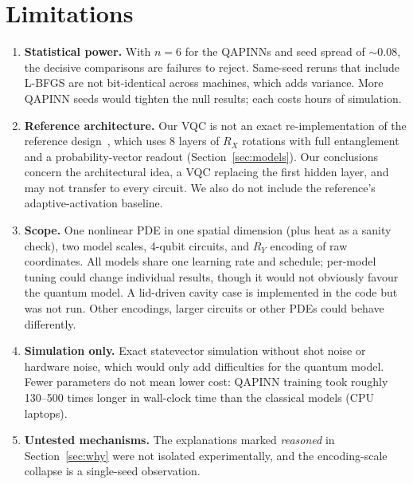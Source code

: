 \documentclass[11pt]{article}
\begin{document}
\section{Limitations}
\begin{enumerate}[nosep]
  \item \textbf{Statistical power.} With $n=6$ for the QAPINNs and seed spread of
  $\sim$0.08, the decisive comparisons are failures to reject. Same-seed reruns that include L-BFGS
  are not bit-identical across machines, which adds variance. More QAPINN seeds would
  tighten the null results; each costs hours of simulation.
  \item \textbf{Reference architecture.} Our VQC is not an exact re-implementation of the
  reference design~\cite{qapinn}, which uses 8 layers of $R_X$ rotations with full
  entanglement and a probability-vector readout (Section~\ref{sec:models}). Our conclusions concern
  the architectural idea, a VQC replacing the first hidden layer, and may not transfer
  to every circuit. We also do not include the reference's adaptive-activation
  baseline.
  \item \textbf{Scope.} One nonlinear PDE in one spatial dimension (plus heat as a
  sanity check), two model scales, 4-qubit circuits, and $R_Y$ encoding of raw
  coordinates. All models share one learning rate and schedule; per-model tuning could
  change individual results, though it would not obviously favour the quantum model. A
  lid-driven cavity case is implemented in the code but was not run.
  Other encodings, larger circuits or other PDEs could behave differently.
  \item \textbf{Simulation only.} Exact statevector simulation without shot noise or
  hardware noise, which would only add difficulties for the quantum model. Fewer
  parameters do not mean lower cost: QAPINN training took roughly 130--500 times longer in
  wall-clock time than the classical models (CPU laptops).
  \item \textbf{Untested mechanisms.} The explanations marked \emph{reasoned} in
  Section~\ref{sec:why} were not isolated experimentally, and the encoding-scale
  collapse is a single-seed observation.
\end{enumerate}

\end{document}
